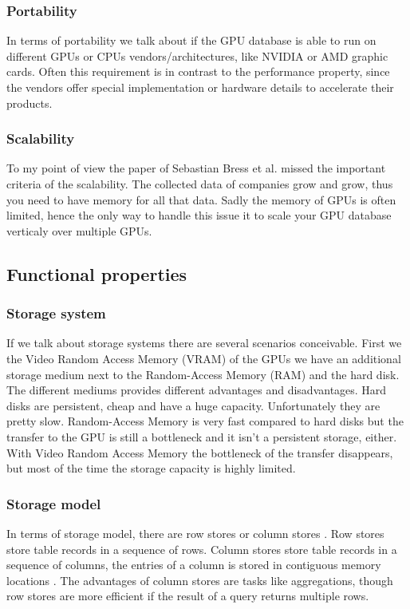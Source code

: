 \subsubsection{Portability}
In terms of portability we talk about if the GPU database is able to run on different GPUs or CPUs vendors/architectures, like NVIDIA or AMD graphic cards.
Often this requirement is in contrast to the performance property, since the vendors offer special implementation or hardware details to accelerate their products.

\subsubsection{Scalability}
To my point of view the paper \cite{bress2014gpu} of Sebastian Bress et al. missed the important criteria of the scalability.
The collected data of companies grow and grow, thus you need to have memory for all that data. Sadly the memory of GPUs is often limited,
hence the only way to handle this issue it to scale your GPU database verticaly over multiple GPUs.

\subsection{Functional properties}

\subsubsection{Storage system}
If we talk about storage systems there are several scenarios conceivable.
First we the Video Random Access Memory (VRAM) of the GPUs we have an additional storage medium next to the Random-Access Memory (RAM) and the hard disk.
The different mediums provides different advantages and disadvantages.
Hard disks are persistent, cheap and have a huge capacity.
Unfortunately they are pretty slow.
Random-Access Memory is very fast compared to hard disks but the transfer to the GPU is still a bottleneck and it isn't a persistent storage, either.
With Video Random Access Memory the bottleneck of the transfer disappears, but most of the time the storage capacity is highly limited.

\subsubsection{Storage model}
In terms of storage model, there are row stores or column stores \cite{abadi2008column}.
Row stores store table records in a sequence of rows.
Column stores store table records in a sequence of columns, the entries of a column is stored in contiguous memory locations \cite{bress2014design}.
The advantages of column stores are tasks like aggregations, though row stores are more efficient if the result of a query returns multiple rows.


